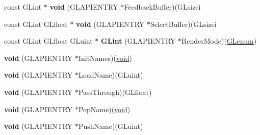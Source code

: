\begin{DoxyCompactItemize}
\item 
\mbox{\label{struct_____g_ldispatch_table_rec_ac9b912ad3c414255b024e24ab96a6cb4}} 
const G\+Lint $\ast$ {\bfseries void} (G\+L\+A\+P\+I\+E\+N\+T\+RY $\ast$Feedback\+Buffer)(G\+Lsizei
\item 
\mbox{\label{struct_____g_ldispatch_table_rec_a4656f4c8ab83ceb1834a8e77e26e661d}} 
const G\+Lint G\+Lfloat $\ast$ {\bfseries void} (G\+L\+A\+P\+I\+E\+N\+T\+RY $\ast$Select\+Buffer)(G\+Lsizei
\item 
\mbox{\label{struct_____g_ldispatch_table_rec_a8b0ed9a7a960f85ee4c3580969e9b5c8}} 
const G\+Lint G\+Lfloat G\+Luint $\ast$ {\bfseries G\+Lint} (G\+L\+A\+P\+I\+E\+N\+T\+RY $\ast$Render\+Mode)(\hyperlink{interfacevoid}{G\+Lenum})
\item 
\mbox{\label{struct_____g_ldispatch_table_rec_afa09382ae5257a83def3f8c3658d39bb}} 
{\bfseries void} (G\+L\+A\+P\+I\+E\+N\+T\+RY $\ast$Init\+Names)(\hyperlink{interfacevoid}{void})
\item 
\mbox{\label{struct_____g_ldispatch_table_rec_ab1247d48e7f25c4526bea66ff99c898b}} 
{\bfseries void} (G\+L\+A\+P\+I\+E\+N\+T\+RY $\ast$Load\+Name)(G\+Luint)
\item 
\mbox{\label{struct_____g_ldispatch_table_rec_a5a43cf8d9c01ddba70cebeeb07403d95}} 
{\bfseries void} (G\+L\+A\+P\+I\+E\+N\+T\+RY $\ast$Pass\+Through)(G\+Lfloat)
\item 
\mbox{\label{struct_____g_ldispatch_table_rec_afac3d49f7b2e3424ee814dd2c97e017e}} 
{\bfseries void} (G\+L\+A\+P\+I\+E\+N\+T\+RY $\ast$Pop\+Name)(\hyperlink{interfacevoid}{void})
\item 
\mbox{\label{struct_____g_ldispatch_table_rec_a44dd7f8d383b49a978fe74f0f213f2e8}} 
{\bfseries void} (G\+L\+A\+P\+I\+E\+N\+T\+RY $\ast$Push\+Name)(G\+Luint)
\item 
\mbox{\label{struct_____g_ldispatch_table_rec_a8307f0e1b07a01e7c1ffbf2fea60bf2a}} 

\end{DoxyCompactItemize}
